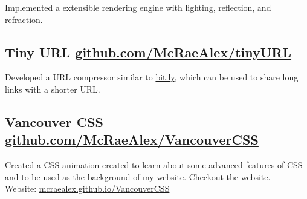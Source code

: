 \documentclass{article}
\begin{document}
Implemented a extensible rendering engine with lighting, reflection, and 
refraction.

\subsection{Tiny URL \href{https://github.com/McRaeAlex/tinyURL}{github.com/McRaeAlex/tinyURL}}

Developed a URL compressor similar to \href{bit.ly}{bit.ly}, which can be used to share long links with a 
shorter URL.

\subsection{Vancouver CSS  \href{https://github.com/McRaeAlex/VancouverCSS}{github.com/McRaeAlex/VancouverCSS}}

Created a CSS animation created to learn about some advanced features of CSS and to be 
used as the background of my website. Checkout the website.\\
\indent Website: \href{https://mcraealex.github.io/VancouverCSS/}{mcraealex.github.io/VancouverCSS}
\end{document}

